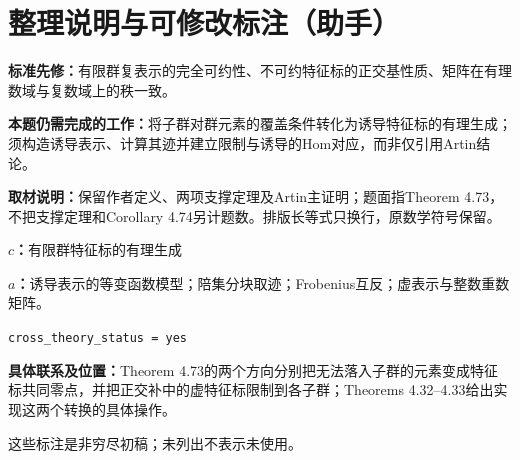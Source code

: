 \documentclass[UTF8,11pt,a4paper]{ctexart}
\theoremstyle{definition}\newtheorem*{definition}{Definition}
\theoremstyle{remark}\newtheorem*{remark}{Remark}
\begin{document}
\section*{整理说明与可修改标注（助手）}
\textbf{标准先修：}有限群复表示的完全可约性、不可约特征标的正交基性质、矩阵在有理数域与复数域上的秩一致。

\textbf{本题仍需完成的工作：}将子群对群元素的覆盖条件转化为诱导特征标的有理生成；须构造诱导表示、计算其迹并建立限制与诱导的Hom对应，而非仅引用Artin结论。

\textbf{取材说明：}保留作者定义、两项支撑定理及Artin主证明；题面指Theorem 4.73，不把支撑定理和Corollary 4.74另计题数。排版长等式只换行，原数学符号保留。

\textbf{$c$：}有限群特征标的有理生成

\textbf{$a$：}诱导表示的等变函数模型；陪集分块取迹；Frobenius互反；虚表示与整数重数矩阵。

\texttt{cross\_theory\_status = yes}

\textbf{具体联系及位置：}Theorem 4.73的两个方向分别把无法落入子群的元素变成特征标共同零点，并把正交补中的虚特征标限制到各子群；Theorems 4.32--4.33给出实现这两个转换的具体操作。

这些标注是非穷尽初稿；未列出不表示未使用。
\end{document}
